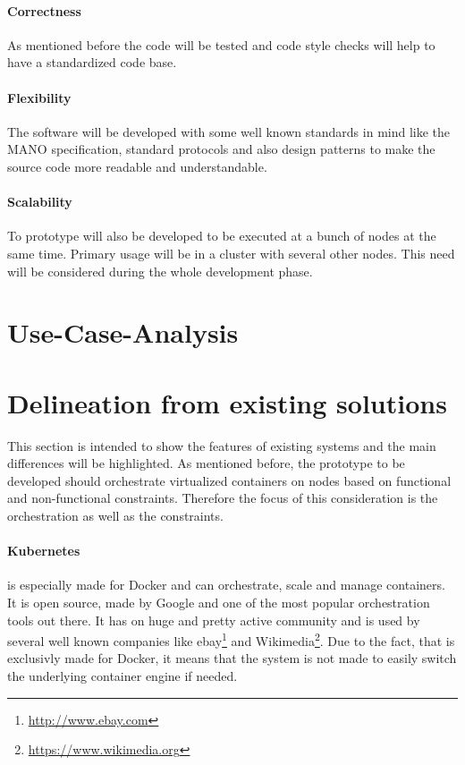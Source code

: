 \paragraph{Correctness} As mentioned before the code will be tested and code style checks will help to have a standardized code base.
\paragraph{Flexibility} The software will be developed with some well known standards in mind like the \ac{MANO} specification, standard protocols and also design patterns to make the source code more readable and understandable.
\paragraph{Scalability} To prototype will also be developed to be executed at a bunch of nodes at the same time.
Primary usage will be in a cluster with several other nodes.
This need will be considered during the whole development phase.


\section{Use-Case-Analysis}
\label{section:use-case-analysis}
\doit

\section{Delineation from existing solutions}
\label{section:delineation-from-existing-solutions}
This section is intended to show the features of existing systems and the main differences will be highlighted.
As mentioned before, the prototype to be developed should orchestrate virtualized containers on nodes based on functional and non-functional constraints.
Therefore the focus of this consideration is the orchestration as well as the constraints.

\paragraph{Kubernetes} is especially made for Docker and can orchestrate, scale and manage containers.
It is open source, made by Google and one of the most popular orchestration tools out there.
It has on huge and pretty active community and is used by several well known companies\autocite{Kubernetes:Case-Studies} like ebay\footnote{\url{http://www.ebay.com}} and Wikimedia\footnote{\url{https://www.wikimedia.org}}.
Due to the fact, that is exclusivly made for Docker, it means that the system is not made to easily switch the underlying container engine if needed.

